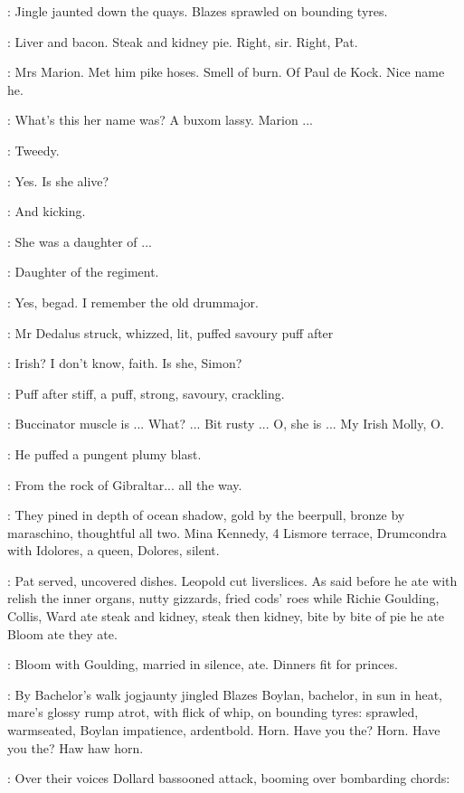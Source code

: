 :
Jingle jaunted down the quays. Blazes sprawled on bounding tyres.

\BloomInt:
Liver and bacon. Steak and kidney pie. Right, sir. Right, Pat.

\BloomInt:
Mrs Marion. Met him pike hoses.
Smell of burn. Of Paul de Kock.
Nice name he.

\Dollard:
What's this her name was? A buxom lassy. Marion ...

\Simon:
Tweedy.

\Dollard:
Yes. Is she alive?

\Simon:
And kicking.

\Dollard:
She was a daughter of ...

\Simon:
Daughter of the regiment.

\Dollard:
Yes, begad. I remember the old drummajor.

:
Mr Dedalus struck, whizzed, lit, puffed savoury puff after

\Dollard:
Irish? I don't know, faith.
Is she, Simon?

:
Puff after stiff, a puff, strong, savoury, crackling.

\Simon:
Buccinator muscle is ... What? ... Bit rusty ... O, she is ... My
Irish Molly, O.

:
He puffed a pungent plumy blast.

\Simon:
From the rock of Gibraltar... all the way.

:
They pined in depth of ocean shadow, gold by the beerpull, bronze by
maraschino, thoughtful all two. Mina Kennedy, 4 Lismore terrace,
Drumcondra with Idolores, a queen, Dolores, silent.

:
Pat served, uncovered dishes. Leopold cut liverslices.
As said before he ate with relish the inner organs,
nutty gizzards, fried cods' roes while
Richie Goulding, Collis, Ward ate steak and kidney, steak then kidney,
bite by bite of pie he ate Bloom ate they ate.

:
Bloom with Goulding, married in silence, ate.
Dinners fit for princes.

:
By Bachelor's walk jogjaunty jingled Blazes Boylan, bachelor, in sun
in heat, mare's glossy rump atrot, with flick of whip, on bounding tyres:
sprawled, warmseated, Boylan impatience, ardentbold. Horn. Have you
the? Horn. Have you the? Haw haw horn.

:
Over their voices Dollard bassooned attack, booming over bombarding
chords:

